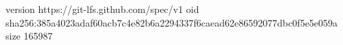 version https://git-lfs.github.com/spec/v1
oid sha256:385a4023adaf60acb7c4e82b6a2294337f6caead62e86592077dbc0f5e5e059a
size 165987
